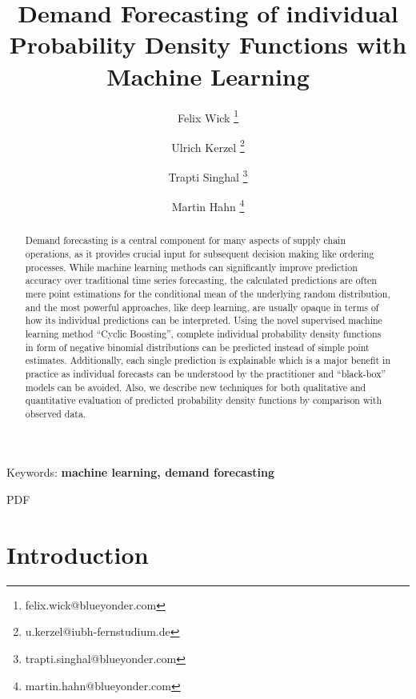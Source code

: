 \documentclass[BCOR=1mm, DIV=calc,10pt,
twoside=true,
twocolumn,
headings=normal]{scrartcl}
\begin{document}
\title{Demand Forecasting of individual Probability Density Functions with Machine Learning}

\author[1]{Felix Wick \thanks{felix.wick@blueyonder.com}}
\author[2]{Ulrich Kerzel \thanks{u.kerzel@iubh-fernstudium.de}}
\author[1]{Trapti Singhal \thanks{trapti.singhal@blueyonder.com}}
\author[1]{Martin Hahn \thanks{martin.hahn@blueyonder.com}}


\date{}

\maketitle

\begin{abstract}
Demand forecasting is a central component for many aspects of supply chain operations, as it provides crucial input for subsequent decision making like ordering processes. While machine learning methods can significantly improve prediction accuracy over traditional time series forecasting, the calculated predictions are often mere point estimations for the conditional mean of the underlying random distribution, and the most powerful approaches, like deep learning, are usually opaque in terms of how its individual predictions can be interpreted. Using the novel supervised machine learning method ``Cyclic Boosting'', complete individual probability density functions in form of negative binomial distributions can be predicted instead of simple point estimates. Additionally, each single prediction is explainable which is a major benefit in practice as individual forecasts can be understood by the practitioner and ``black-box'' models can be avoided. Also, we describe new techniques for both qualitative and quantitative evaluation of predicted probability density functions by comparison with observed data.
\end{abstract}

{Keywords: \textbf{machine learning, demand forecasting}}

PDF
\section{Introduction}
\end{document}
